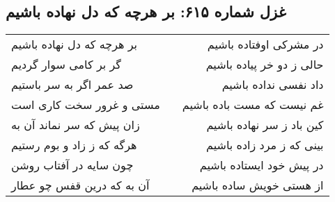 \begin{center}
\section*{غزل شماره ۶۱۵: بر هرچه که دل نهاده باشیم}
\label{sec:615}
\begin{longtable}{l p{0.5cm} r}
بر هرچه که دل نهاده باشیم
&&
در مشرکی اوفتاده باشیم
\\
گر بر کامی سوار گردیم
&&
حالی ز دو خر پیاده باشیم
\\
صد عمر اگر به سر باستیم
&&
داد نفسی نداده باشیم
\\
مستی و غرور سخت کاری است
&&
غم نیست که مست باده باشیم
\\
زان پیش که سر نماند آن به
&&
کین باد ز سر نهاده باشیم
\\
هرگه که ز زاد و بوم رستیم
&&
بینی که ز مرد زاده باشیم
\\
چون سایه در آفتاب روشن
&&
در پیش خود ایستاده باشیم
\\
آن به که درین قفس چو عطار
&&
از هستی خویش ساده باشیم
\\
\end{longtable}
\end{center}
